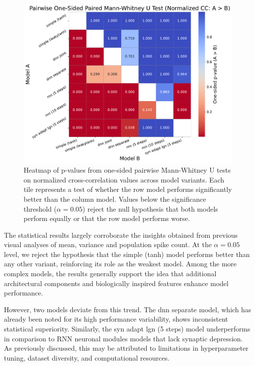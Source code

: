\begin{figure}
    \centering
    \includegraphics[width=\linewidth]{img/plots/model_types_p_value_heatmap_cc_norm.pdf}
    \caption{Heatmap of p-values from one-sided pairwise Mann-Whitney U tests on normalized cross-correlation values across model variants. Each tile represents a test of whether the row model performs significantly better than the column model. Values below the significance threshold ($\alpha = 0.05$) reject the null hypothesis that both models perform equally or that the row model performs worse.}
    \label{fig:model_types_p_values_heatmap}
\end{figure}

The statistical results largely corroborate the insights obtained from previous visual analyses of mean, variance and population spike count. At the $\alpha = 0.05$ level, we reject the hypothesis that the simple (tanh) model performs better than any other variant, reinforcing its role as the weakest model. Among the more complex models, the results generally support the idea that additional architectural components and biologically inspired features enhance model performance.

However, two models deviate from this trend. The dnn separate model, which has already been noted for its high performance variability, shows inconsistent statistical superiority. Similarly, the syn adapt lgn (5 steps) model underperforms in comparison to RNN neuronal modules models that lack synaptic depression. As previously discussed, this may be attributed to limitations in hyperparameter tuning, dataset diversity, and computational resources.

